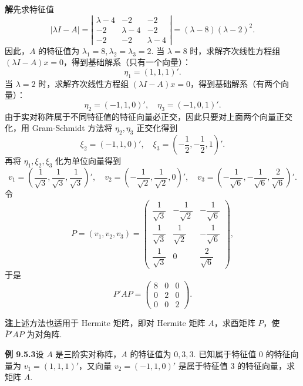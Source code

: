 \documentclass[UTF8,12pt,a4paper,fontset=fandol]{ctexart}
\begin{document}
\noindent\textbf{解}\quad 先求特征值
\[
  |\lambda I-A|=
  \left|\begin{array}{ccc}
    \lambda-4 & -2 & -2\\
    -2 & \lambda-4 & -2\\
    -2 & -2 & \lambda-4
  \end{array}\right|
  =(\lambda-8)(\lambda-2)^2.
\]
因此，$A$ 的特征值为 $\lambda_1=8,\lambda_2=\lambda_3=2$. 当 $\lambda=8$ 时，求解齐次线性方程组 $(\lambda I-A)x=0$，得到基础解系（只有一个向量）：
\[
  \eta_1=(1,1,1)'.
\]
当 $\lambda=2$ 时，求解齐次线性方程组 $(\lambda I-A)x=0$，得到基础解系（有两个向量）：
\[
  \eta_2=(-1,1,0)',\quad \eta_3=(-1,0,1)'.
\]
由于实对称阵属于不同特征值的特征向量必正交，因此只要对上面两个向量正交化，用 Gram-Schmidt 方法将 $\eta_2,\eta_3$ 正交化得到
\[
  \xi_2=(-1,1,0)',\quad \xi_3=\left(-\frac12,-\frac12,1\right)'.
\]
再将 $\eta_1,\xi_2,\xi_3$ 化为单位向量得到
\[
  v_1=\left(\frac1{\sqrt3},\frac1{\sqrt3},\frac1{\sqrt3}\right)',\quad
  v_2=\left(-\frac1{\sqrt2},\frac1{\sqrt2},0\right)',\quad
  v_3=\left(-\frac1{\sqrt6},-\frac1{\sqrt6},\frac2{\sqrt6}\right)'.
\]
令
\[
  P=(v_1,v_2,v_3)=
  \left(\begin{array}{ccc}
    \dfrac1{\sqrt3} & -\dfrac1{\sqrt2} & -\dfrac1{\sqrt6}\\
    \dfrac1{\sqrt3} & \dfrac1{\sqrt2} & -\dfrac1{\sqrt6}\\
    \dfrac1{\sqrt3} & 0 & \dfrac2{\sqrt6}
  \end{array}\right),
\]
于是
\[
  P'AP=
  \left(\begin{array}{ccc}
    8 & 0 & 0\\
    0 & 2 & 0\\
    0 & 0 & 2
  \end{array}\right).
\]

\noindent\textbf{注}\quad 上述方法也适用于 Hermite 矩阵，即对 Hermite 矩阵 $A$，求酉矩阵 $P$，使 $\overline P'AP$ 为对角阵.

\noindent\textbf{例 9.5.3}\quad 设 $A$ 是三阶实对称阵，$A$ 的特征值为 $0,3,3$. 已知属于特征值 $0$ 的特征向量为 $v_1=(1,1,1)'$，又向量 $v_2=(-1,1,0)'$ 是属于特征值 $3$ 的特征向量，求矩阵 $A$.
\end{document}
